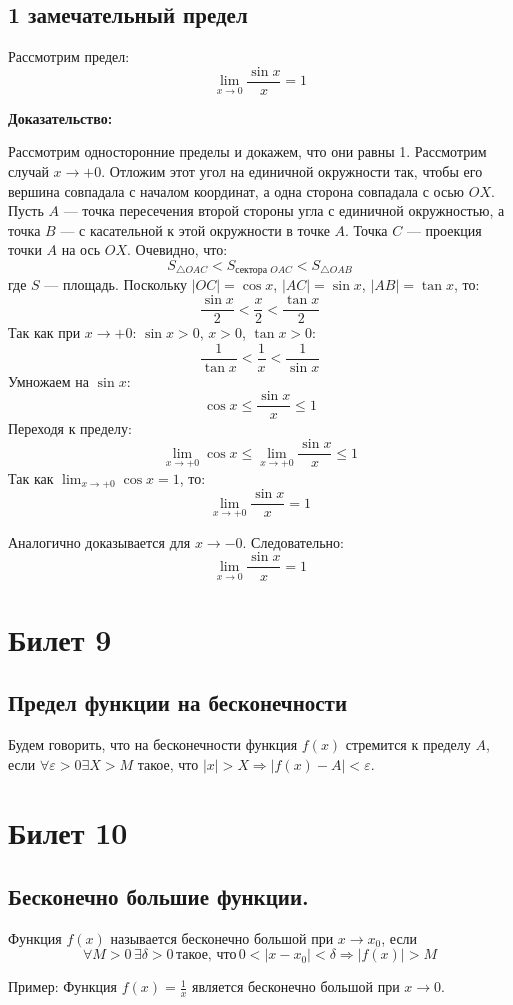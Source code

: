 \documentclass{article}
\begin{document}
\subsection*{1 замечательный предел}
Рассмотрим предел:
\[
\lim_{x \to 0} \frac{\sin x}{x} = 1
\]

\textbf{Доказательство:}

Рассмотрим односторонние пределы и докажем, что они равны 1. Рассмотрим случай \( x \to +0 \). Отложим этот угол на единичной окружности так, чтобы его вершина совпадала с началом координат, а одна сторона совпадала с осью \( OX \). Пусть \( A \) — точка пересечения второй стороны угла с единичной окружностью, а точка \( B \) — с касательной к этой окружности в точке \( A \). Точка \( C \) — проекция точки \( A \) на ось \( OX \). Очевидно, что:
\[
S_{\triangle OAC} < S_{\text{сектора } OAC} < S_{\triangle OAB}
\]
где \( S \) — площадь. Поскольку \( |OC| = \cos x \), \( |AC| = \sin x \), \( |AB| = \tan x \), то:
\[
\frac{\sin x}{2} < \frac{x}{2} < \frac{\tan x}{2}
\]
Так как при \( x \to +0 \): \( \sin x > 0 \), \( x > 0 \), \( \tan x > 0 \):
\[
\frac{1}{\tan x} < \frac{1}{x} < \frac{1}{\sin x}
\]
Умножаем на \( \sin x \):
\[
\cos x \leq \frac{\sin x}{x} \leq 1
\]
Переходя к пределу:
\[
\lim_{x \to +0} \cos x \leq \lim_{x \to +0} \frac{\sin x}{x} \leq 1
\]
Так как \( \lim_{x \to +0} \cos x = 1 \), то:
\[
\lim_{x \to +0} \frac{\sin x}{x} = 1
\]

Аналогично доказывается для \( x \to -0 \). Следовательно:
\[
\lim_{x \to 0} \frac{\sin x}{x} = 1
\]

\section{Билет 9}

\subsection*{Предел функции на бесконечности}
Будем говорить, что на бесконечности функция \( f(x) \) стремится к пределу \( A \), если \( \forall \varepsilon > 0 \exists X > M \) такое, что \( |x| > X \Rightarrow |f(x) - A| < \varepsilon \).

\section{Билет 10}

\subsection*{Бесконечно большие функции.}

Функция \( f(x) \) называется бесконечно большой при \( x \to x_0 \), если
\[
\forall M > 0 \, \exists \delta > 0 \, \text{такое, что} \, 0 < |x - x_0| < \delta \Rightarrow |f(x)| > M
\]

Пример:
Функция \( f(x) = \frac{1}{x} \) является бесконечно большой при \( x \to 0 \).
\end{document}

